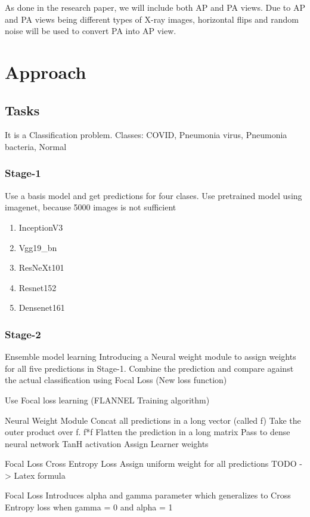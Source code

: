 \documentclass{sigkddExp}
\begin{document}
As done in the research paper, we will include  both AP and PA views. Due to AP and PA views being different types of X-ray images, horizontal flips and random noise will be used to convert PA into AP view. 

\section{Approach}

\subsection{Tasks}
It is a Classification problem.
Classes: COVID, Pneumonia virus, Pneumonia bacteria, Normal
\subsubsection{Stage-1}
Use a basis model and get predictions for four clases. Use pretrained model using imagenet, because 5000 images is not sufficient 


\begin{enumerate}
    \item InceptionV3
    \item Vgg19\_bn
    \item ResNeXt101
    \item Resnet152
    \item Densenet161
\end{enumerate}


\subsubsection{Stage-2}

Ensemble model learning
Introducing a Neural weight module to assign weights for all five predictions in Stage-1.
Combine the prediction and compare against the actual classification using Focal Loss (New loss function)

Use Focal loss learning (FLANNEL Training algorithm)

Neural Weight Module
Concat all predictions in a long vector (called f)
Take the outer product over f. f*f
Flatten the prediction in a long matrix
Pass to dense neural network
TanH activation
Assign Learner weights

Focal Loss
Cross Entropy Loss
Assign uniform weight for all predictions
TODO -> Latex formula

Focal Loss
Introduces alpha and gamma parameter which generalizes to Cross Entropy loss when gamma = 0 and alpha = 1
\end{document}

